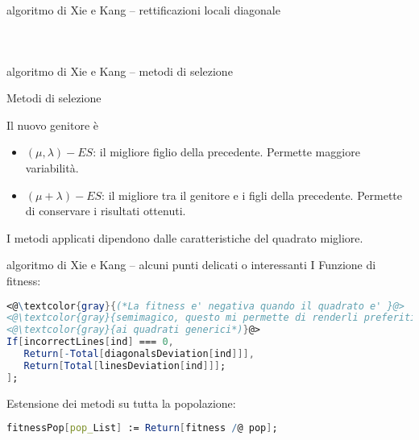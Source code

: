 \documentclass[10pt]{beamer}
\begin{document}
\begin{frame}{algoritmo di Xie e Kang -- rettificazioni locali diagonale}
\begin{columns}[onlytextwidth]
\begin{figure}[htbp]
{			
			}
			
		\end{figure}
		
	\end{columns}
\end{frame}

\begin{frame}{algoritmo di Xie e Kang -- metodi di selezione}
	\begin{block}{Metodi di selezione}
		\parbox{0.97\columnwidth}{
			Il nuovo genitore è 
			\begin{itemize}
				\item$ (\mu, \lambda)-ES $: il migliore figlio della precedente. Permette maggiore variabilità.
				\item $ (\mu + \lambda)-ES $: il migliore tra il genitore e i figli della precedente. Permette di conservare i risultati ottenuti.
			\end{itemize}
			I metodi applicati dipendono dalle caratteristiche del quadrato migliore.
		}
	\end{block}
\end{frame}

\begin{frame}[fragile]{algoritmo di Xie e Kang -- alcuni punti delicati o interessanti I}
	Funzione di fitness:
	
\begin{lstlisting}[language=Mathematica,basicstyle=\ttfamily,keywordstyle=\color{blue}]	
<@\textcolor{gray}{(*La fitness e' negativa quando il quadrato e' }@>
<@\textcolor{gray}{semimagico, questo mi permette di renderli preferiti}@>
<@\textcolor{gray}{ai quadrati generici*)}@>
If[incorrectLines[ind] === 0,
   Return[-Total[diagonalsDeviation[ind]]],
   Return[Total[linesDeviation[ind]]];
];
\end{lstlisting}
\vspace*{10pt}
Estensione dei metodi su tutta la popolazione:
\vspace*{-10pt}
\begin{lstlisting}[language=Mathematica,basicstyle=\ttfamily,keywordstyle=\color{blue}]	
fitnessPop[pop_List] := Return[fitness /@ pop];
\end{lstlisting}
\end{frame}
\end{document}
